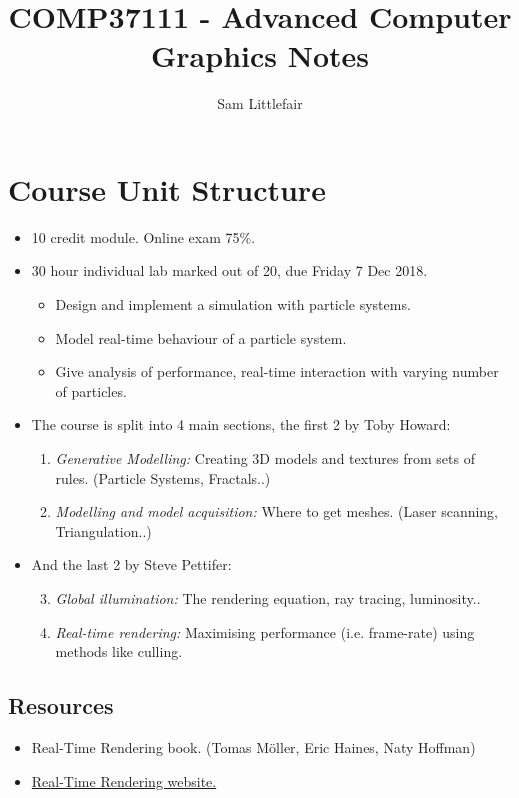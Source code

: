 \documentclass[11pt]{article}
\title{COMP37111 - Advanced Computer Graphics Notes}
\author{Sam Littlefair}
\begin{document}
  \maketitle


  \section{Course Unit Structure}
  \begin{itemize}
    \item 10 credit module. Online exam 75\%.

    \item 30 hour individual lab marked out of 20, due Friday 7 Dec 2018.
    \begin{itemize}
      \item Design  and implement a simulation with particle systems.
      \item Model real-time behaviour of a particle system.
      \item Give analysis of performance, real-time interaction with varying number of particles.
    \end{itemize}
  \end{itemize}

  \begin{itemize}
    \item The course is split into 4 main sections, the first 2 by Toby Howard:
    \begin{enumerate}
      \item \textit{Generative Modelling:} Creating 3D models and textures from sets of rules. (Particle Systems, Fractals..)
      \item \textit{Modelling and model acquisition:} Where to get meshes. (Laser scanning, Triangulation..)
    \end{enumerate}

    \item And the last 2 by Steve Pettifer:
    \begin{enumerate}
      \setcounter{enumi}{2}
      \item \textit{Global illumination:} The rendering equation, ray tracing, luminosity..
      \item \textit{Real-time rendering:} Maximising performance (i.e. frame-rate) using methods like culling.
    \end{enumerate}
  \end{itemize}
  \subsection{Resources}
  \begin{itemize}
    \item Real-Time Rendering book. (Tomas Möller, Eric Haines, Naty Hoffman)
    \item \href{http://www.realtimerendering.com/}{Real-Time Rendering website.}
  \end{itemize}
\end{document}
